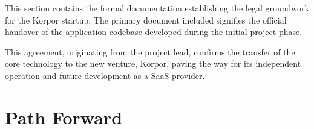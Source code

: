 \begin{tcolorbox}[
    enhanced,
    breakable, %
    colback=accent!25, %
    colframe=accent!70!black, %
    boxrule=0.8pt,
    arc=1mm,
    title={\textbf{\color{white}Legal Framework}},
    fonttitle=\bfseries,
    coltitle=accent!50!primary %
]
This section contains the formal documentation establishing the legal groundwork for the Korpor startup. The primary document included signifies the official handover of the application codebase developed during the initial project phase.


This agreement, originating from the project lead, confirms the transfer of the core technology to the new venture, Korpor, paving the way for its independent operation and future development as a SaaS provider.
\end{tcolorbox}

\vspace{1cm} %

\section{Path Forward}

